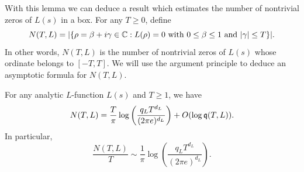    With this lemma we can deduce a result which estimates the number of nontrivial zeros of \(L(s)\) in a box. For any \(T \ge 0\), define
    \[
      N(T,L) = |\{\rho = \beta+i\gamma \in \mathbb{C}:L(\rho) = 0 \text{ with } 0 \le \beta \le 1 \text{ and } |\gamma| \le T\}|.
    \]
    In other words, \(N(T,L)\) is the number of nontrivial zeros of \(L(s)\) whose ordinate belongs to \([-T,T]\). We will use the argument principle to deduce an asymptotic formula for \(N(T,L)\).

    \begin{theorem}\label{thm:zero_counting}
      For any analytic \(L\)-function \(L(s)\) and \(T \ge 1\), we have
      \[
        N(T,L) = \frac{T}{\pi}\log\left(\frac{q_{L}T^{d_{L}}}{(2\pi e)^{d_{L}}}\right)+O(\log{\mathfrak{q}(T,L)}).
      \]
      In particular,
      \[
        \frac{N(T,L)}{T} \sim \frac{1}{\pi}\log\left(\frac{q_{L}T^{d_{L}}}{(2\pi e)^{d_{L}}}\right).
      \]
    \end{theorem}
